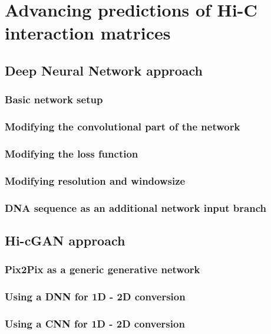 \section{Advancing predictions of Hi-C interaction matrices}
\subsection{Deep Neural Network approach}
\subsubsection{Basic network setup}
\subsubsection{Modifying the convolutional part of the network}
\subsubsection{Modifying the loss function}
\subsubsection{Modifying resolution and windowsize}
\subsubsection{DNA sequence as an additional network input branch}
\subsection{Hi-cGAN approach} \label{sec:hi-cGAN}
\subsubsection{Pix2Pix as a generic generative network}
\subsubsection{Using a DNN for 1D - 2D conversion}
\subsubsection{Using a CNN for 1D - 2D conversion}

